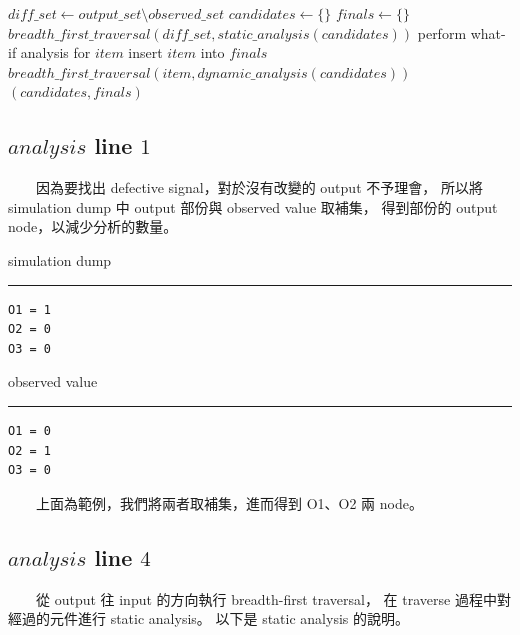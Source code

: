 \documentclass[12pt,a4paper]{article}
\begin{document}
\begin{CJK*}{UTF8}{song}
{\linespread{1}

\begin{algorithm}
\caption{$analysis(output\_set, observed\_set)$}
\begin{algorithmic}[1]
\STATE $diff\_set \leftarrow output\_set \setminus observed\_set$
\STATE $candidates \leftarrow \{\}$
\STATE $finals \leftarrow \{\}$
\STATE $breadth\_first\_traversal(diff\_set, static\_analysis(candidates))$
    \STATE perform what-if analysis for $item$
        \STATE insert $item$ into $finals$
    \ELSE
        \STATE $breadth\_first\_traversal(item, dynamic\_analysis(candidates))$
    \ENDIF
\ENDFOR
\RETURN $(candidates, finals)$
\end{algorithmic}
\end{algorithm}

}

\subsection{$analysis$ line $1$}

　　因為要找出 defective signal，對於沒有改變的 output 不予理會，%
所以將 simulation dump 中 output 部份與 observed value 取補集，%
得到部份的 output node，以減少分析的數量。%

\begin{center}
\begin{minipage}{0.3\textwidth}
\center
simulation dump
\hrule
\begin{verbatim}
O1 = 1
O2 = 0
O3 = 0
\end{verbatim}
\end{minipage}
\begin{minipage}{0.3\textwidth}
\center
observed value
\hrule
\begin{verbatim}
O1 = 0
O2 = 1
O3 = 0
\end{verbatim}
\end{minipage}
\end{center}

　　上面為範例，我們將兩者取補集，進而得到 O1、O2 兩 node。

\subsection{$analysis$ line $4$}

　　從 output 往 input 的方向執行 breadth-first traversal，%
在 traverse 過程中對經過的元件進行 static analysis。%
以下是 static analysis 的說明。


\end{CJK*}
\end{document}
